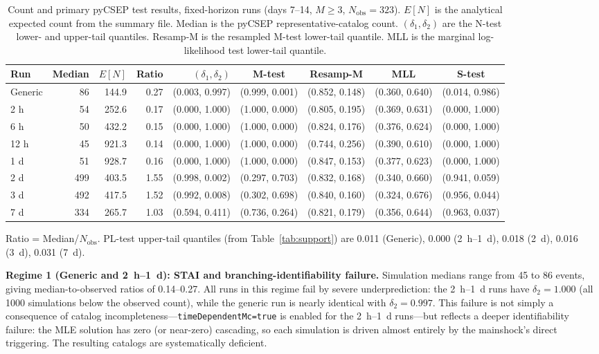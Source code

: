 \documentclass[12pt,letterpaper]{article}
\begin{document}
\begin{table}[ht]
\centering
\small
\caption{Count and primary pyCSEP test results, fixed-horizon runs
(days 7--14, $M\geq3$, $N_{\mathrm{obs}}=323$).
$E[N]$ is the analytical expected count from the summary file.
Median is the pyCSEP representative-catalog count.
$(\delta_1,\delta_2)$ are the N-test lower- and upper-tail quantiles.
Resamp-M is the resampled M-test lower-tail quantile.
MLL is the marginal log-likelihood test lower-tail quantile.}
\label{tab:counts}
\begin{tabular}{lrrrrcccc}
\toprule
Run & Median & $E[N]$ & Ratio & $(\delta_1,\delta_2)$ & M-test & Resamp-M & MLL & S-test \\
\midrule
Generic & 86 & 144.9 & 0.27 & (0.003, 0.997) & (0.999, 0.001) & (0.852, 0.148) & (0.360, 0.640) & (0.014, 0.986) \\
2 h & 54 & 252.6 & 0.17 & (0.000, 1.000) & (1.000, 0.000) & (0.805, 0.195) & (0.369, 0.631) & (0.000, 1.000) \\
6 h & 50 & 432.2 & 0.15 & (0.000, 1.000) & (1.000, 0.000) & (0.824, 0.176) & (0.376, 0.624) & (0.000, 1.000) \\
12 h & 45 & 921.3 & 0.14 & (0.000, 1.000) & (1.000, 0.000) & (0.744, 0.256) & (0.390, 0.610) & (0.000, 1.000) \\
1 d & 51 & 928.7 & 0.16 & (0.000, 1.000) & (1.000, 0.000) & (0.847, 0.153) & (0.377, 0.623) & (0.000, 1.000) \\
2 d & 499 & 403.5 & 1.55 & (0.998, 0.002) & (0.297, 0.703) & (0.832, 0.168) & (0.340, 0.660) & (0.941, 0.059) \\
3 d & 492 & 417.5 & 1.52 & (0.992, 0.008) & (0.302, 0.698) & (0.840, 0.160) & (0.324, 0.676) & (0.956, 0.044) \\
7 d & 334 & 265.7 & 1.03 & (0.594, 0.411) & (0.736, 0.264) & (0.821, 0.179) & (0.356, 0.644) & (0.963, 0.037) \\
\bottomrule
\end{tabular}
\vspace{4pt}
\raggedright
\footnotesize
Ratio = Median/$N_{\mathrm{obs}}$. PL-test upper-tail quantiles (from Table~\ref{tab:support})
are 0.011 (Generic), 0.000 (2~h--1~d), 0.018 (2~d), 0.016 (3~d), 0.031 (7~d).
\end{table}

\vspace{6pt}
\noindent\textbf{Regime 1 (Generic and 2~h--1~d): STAI and branching-identifiability failure.}
Simulation medians range from 45 to 86 events, giving median-to-observed ratios
of 0.14--0.27. All runs in this regime fail by severe underprediction:
the 2~h--1~d runs have $\delta_2=1.000$ (all 1000 simulations below the
observed count), while the generic run is nearly identical with
$\delta_2=0.997$. This failure is not simply a consequence of catalog
incompleteness---\texttt{timeDependentMc=true} is enabled for the 2~h--1~d
runs---but reflects a deeper identifiability failure: the MLE solution has zero
(or near-zero) cascading, so each simulation is driven almost entirely by the
mainshock's direct triggering. The resulting catalogs are systematically
deficient.
\end{document}
